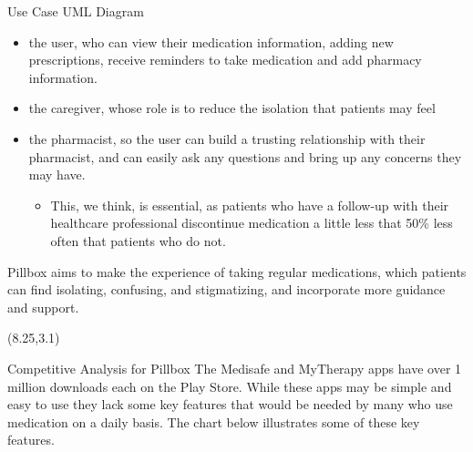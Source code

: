 \documentclass[22pt]{beamer}
\begin{document}
\begin{frame}[fragile]
\begin{textblock}{7.25}
\begin{block}{Use Case UML Diagram}
\begin{itemize} 
\item the user, who can view their medication information, adding new prescriptions, receive reminders to take medication and add pharmacy information. 
\item the caregiver, whose role is to reduce the isolation that patients may feel
\item the pharmacist,  so the user can build a trusting relationship with their pharmacist, and can easily ask any questions and bring up any concerns they may have. 
\begin{itemize}
\item This, we think, is essential, as patients who have a follow-up with their healthcare professional discontinue medication a little less that 50\%  \cite{selmesmitchell2007} less often that patients who do not.
\end{itemize}


\end{itemize}

Pillbox aims to make the experience of taking regular medications, which patients can find isolating, confusing, and stigmatizing, and incorporate more guidance and support.  \\

\end{block}
\end{textblock}



\begin{textblock}{7.25}(8.25,3.1)
\begin{block}{Competitive Analysis for Pillbox}
The Medisafe and MyTherapy apps have over 1 million downloads each on the Play Store. While these apps may be simple and easy to use they lack some key features that would be needed by many who use medication on a daily basis. The chart below illustrates some of these key features.


\end{block}
\end{textblock}
\end{frame}
\end{document}
